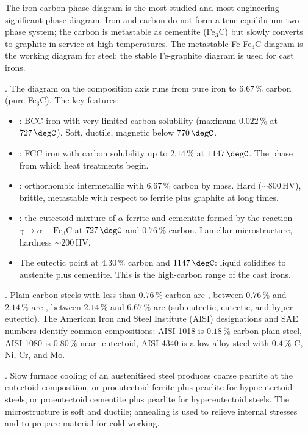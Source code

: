 The iron-carbon phase diagram is the most studied and most
engineering-significant phase diagram. Iron and carbon do not form a
true equilibrium two-phase system; the carbon is metastable as
cementite (Fe$_3$C) but slowly converts to graphite in service at
high temperatures. The metastable Fe-Fe$_3$C diagram is the working
diagram for steel; the stable Fe-graphite diagram is used for cast
irons.

. The diagram on the composition axis runs
from pure iron to $6.67\,\%$ carbon (pure Fe$_3$C). The key features:

\begin{itemize}[leftmargin=*]
\item {}: BCC iron with very limited carbon
  solubility (maximum $0.022\,\%$ at $727\,\degC$). Soft, ductile,
  magnetic below $770\,\degC$.
\item {}: FCC iron with carbon solubility up
  to $2.14\,\%$ at $1147\,\degC$. The phase from which heat
  treatments begin.
\item {}: orthorhombic intermetallic with
  $6.67\,\%$ carbon by mass. Hard ($\sim 800\,\text{HV}$), brittle,
  metastable with respect to ferrite plus graphite at long times.
\item {}: the eutectoid mixture of $\alpha$-ferrite
  and cementite formed by the reaction $\gamma \to \alpha +
  \text{Fe}_3\text{C}$ at $727\,\degC$ and $0.76\,\%$ carbon. Lamellar
  microstructure, hardness $\sim 200\,\text{HV}$.
\item The eutectic point at $4.30\,\%$ carbon and $1147\,\degC$:
  liquid solidifies to austenite plus cementite. This is the
  high-carbon range of the cast irons.
\end{itemize}

. Plain-carbon steels with less than
$0.76\,\%$ carbon are , between $0.76\,\%$ and
$2.14\,\%$ are , between $2.14\,\%$ and $6.67\,
\%$ are  (sub-eutectic, eutectic, and
hyper-eutectic). The American Iron and Steel Institute (AISI)
designations and SAE numbers identify common compositions: AISI 1018
is $0.18\,\%$ carbon plain-steel, AISI 1080 is $0.80\,\%$ near-
eutectoid, AISI 4340 is a low-alloy steel with $0.4\,\%$ C, Ni, Cr,
and Mo.

. Slow furnace cooling of an austenitised steel
produces coarse pearlite at the eutectoid composition, or
proeutectoid ferrite plus pearlite for hypoeutectoid steels, or
proeutectoid cementite plus pearlite for hypereutectoid steels. The
microstructure is soft and ductile; annealing is used to relieve
internal stresses and to prepare material for cold working.


